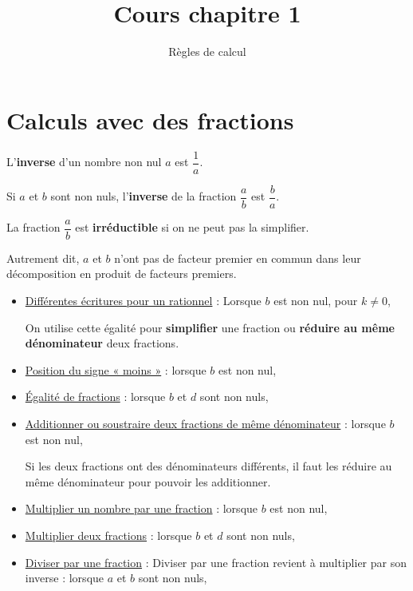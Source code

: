 \documentclass[
	10pt,
	classe=$2^{de}$,
]{coursclass}
\title{Cours chapitre 1}
\author{Règles de calcul}
\date{}
\begin{document}
\maketitle

\section{Calculs avec des fractions}

\begin{definition}[Inverse]
	L’\textbf{inverse} d’un nombre non nul $a$ est $\dfrac{1}{a}$.

	Si $a$ et $b$ sont non nuls, l'\textbf{inverse} de la fraction $\dfrac{a}{b}$ est $\dfrac{b}{a}$.
\end{definition}

\begin{definition}
	La fraction $\dfrac{a}{b}$ est \textbf{irréductible} si on ne peut pas la simplifier.

	Autrement dit, $a$ et $b$ n’ont pas de facteur premier en commun dans leur décomposition en produit de facteurs premiers.
\end{definition}

\begin{itemize}
	\item \uline{Différentes écritures pour un rationnel} : Lorsque $b$ est non nul, pour $k ≠ 0$, 

	      On utilise cette égalité pour \textbf{simplifier} une fraction ou \textbf{réduire au même dénominateur} deux fractions.
	\item \uline{Position du signe « moins »} : lorsque $b$ est non nul, 
	\item \uline{Égalité de fractions} : lorsque $b$ et $d$ sont non nuls, 
	\item \uline{Additionner ou soustraire deux fractions de même dénominateur} : lorsque $b$ est non nul, 

	      Si les deux fractions ont des dénominateurs différents, il faut les réduire au même dénominateur pour pouvoir les
	      additionner.
	\item \uline{Multiplier un nombre par une fraction} : lorsque $b$ est non nul, 
	\item \uline{Multiplier deux fractions} : lorsque $b$ et $d$ sont non nuls, 
	\item \uline{Diviser par une fraction} : Diviser par une fraction revient à multiplier par son inverse : lorsque $a$ et $b$ sont non nuls, 
\end{itemize}
\end{document}
